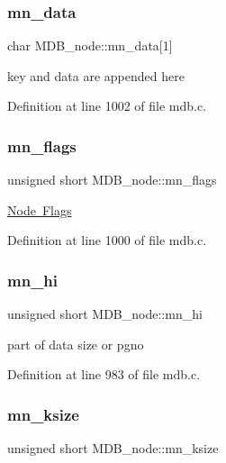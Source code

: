 \subsubsection{\texorpdfstring{mn\+\_\+data}{mn\_data}}
{\footnotesize\ttfamily char M\+D\+B\+\_\+node\+::mn\+\_\+data\mbox{[}1\mbox{]}}

key and data are appended here 

Definition at line 1002 of file mdb.\+c.

\mbox{\label{struct_m_d_b__node_a2c59e19a77ae5f2cc63413017dc20ca1}} 
\subsubsection{\texorpdfstring{mn\+\_\+flags}{mn\_flags}}
{\footnotesize\ttfamily unsigned short M\+D\+B\+\_\+node\+::mn\+\_\+flags}

\mbox{\hyperlink{group__mdb__node}{Node Flags}} 

Definition at line 1000 of file mdb.\+c.

\mbox{\label{struct_m_d_b__node_a0ef414754e56736bcadac31e9a236e86}} 
\subsubsection{\texorpdfstring{mn\+\_\+hi}{mn\_hi}}
{\footnotesize\ttfamily unsigned short M\+D\+B\+\_\+node\+::mn\+\_\+hi}

part of data size or pgno 

Definition at line 983 of file mdb.\+c.

\mbox{\label{struct_m_d_b__node_a0c651711ad2639385a05b64c9e590d84}} 
\subsubsection{\texorpdfstring{mn\+\_\+ksize}{mn\_ksize}}
{\footnotesize\ttfamily unsigned short M\+D\+B\+\_\+node\+::mn\+\_\+ksize}

